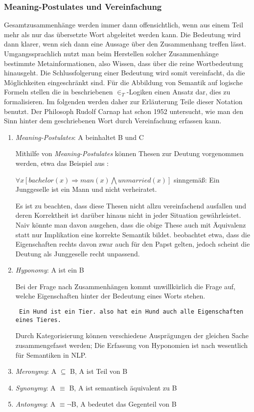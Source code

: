\documentclass[12pt]{paper}
\begin{document}
\subsubsection{Meaning-Postulates und Vereinfachung}
Gesamtzusammenhänge werden immer dann offensichtlich, wenn aus einem Teil mehr als nur das übersetzte Wort abgeleitet werden kann. Die Bedeutung wird dann klarer, wenn sich dann eine Aussage über den Zusammenhang treffen lässt. Umgangssprachlich nutzt man beim Herstellen solcher Zusammenhänge bestimmte Metainformationen, also Wissen, dass über die reine Wortbedeutung hinausgeht. Die Schlussfolgerung einer Bedeutung wird somit vereinfacht, da die Möglichkeiten eingeschränkt sind. Für die Abbildung von Semantik auf logische Formeln stellen die in \cite{sr18} beschriebenen $\in_T$-Logiken einen Ansatz dar, dies zu formalisieren. Im folgenden werden daher zur Erläuterung Teile dieser Notation benutzt. Der Philosoph Rudolf Carnap hat schon 1952  untersucht, wie man den Sinn hinter dem geschriebenen Wort durch Vereinfachung erfassen kann. 
\begin{enumerate}
\item \textit{Meaning-Postulates}: A beinhaltet B und C

Mithilfe von \textit{Meaning-Postulates} können Thesen zur Deutung vorgenommen werden, etwa das Beispiel aus \cite{car52}:

$\forall x[bachelor(x)\Rightarrow man(x)\bigwedge unmarried(x)]$
sinngemäß: Ein Junggeselle ist ein Mann und nicht verheiratet.

Es ist zu beachten, dass diese Thesen nicht allzu vereinfachend ausfallen und deren Korrektheit ist darüber hinaus nicht in jeder Situation gewährleistet. Naiv könnte man davon ausgehen, dass die obige These auch mit Äquivalenz statt nur Implikation eine korrekte Semantik bildet. \cite{car52} beobachtet etwa, dass die Eigenschaften rechts davon zwar auch für den Papst gelten, jedoch scheint die Deutung als Junggeselle recht unpassend.

\item \textit{Hyponomy}: A ist ein B

Bei der Frage nach Zusammenhängen kommt unwillkürlich die Frage auf, welche Eigenschaften hinter der Bedeutung eines Worts stehen. 

\tt
Ein Hund ist ein Tier. 
\rm
also hat ein Hund auch alle Eigenschaften eines Tieres.

Durch Kategorisierung können verschiedene Ausprägungen  der gleichen Sache zusammengefasst werden; Die Erfassung von Hyponomien ist nach \cite{cop04} wesentlich für Semantiken in NLP.

\item \textit{Meronymy}: A $\subseteq$ B, A ist Teil von B

\item \textit{Synonymy}: A $\equiv$ B, A ist semantisch äquivalent zu B

\item \textit{Antonymy}: A $\equiv \neg$B, A bedeutet das Gegenteil von B

\end{enumerate}
\end{document}

